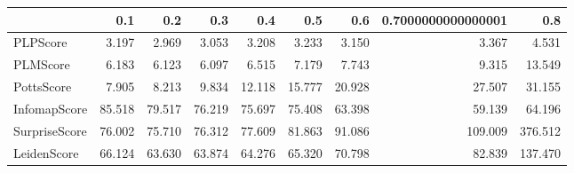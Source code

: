 \begin{tabular}{lrrrrrrrr}
\toprule
{} &    0.1 &    0.2 &    0.3 &    0.4 &    0.5 &    0.6 & 0.7000000000000001 &     0.8 \\
\midrule
PLPScore      &  3.197 &  2.969 &  3.053 &  3.208 &  3.233 &  3.150 &              3.367 &   4.531 \\
PLMScore      &  6.183 &  6.123 &  6.097 &  6.515 &  7.179 &  7.743 &              9.315 &  13.549 \\
PottsScore    &  7.905 &  8.213 &  9.834 & 12.118 & 15.777 & 20.928 &             27.507 &  31.155 \\
InfomapScore  & 85.518 & 79.517 & 76.219 & 75.697 & 75.408 & 63.398 &             59.139 &  64.196 \\
SurpriseScore & 76.002 & 75.710 & 76.312 & 77.609 & 81.863 & 91.086 &            109.009 & 376.512 \\
LeidenScore   & 66.124 & 63.630 & 63.874 & 64.276 & 65.320 & 70.798 &             82.839 & 137.470 \\
\bottomrule
\end{tabular}
